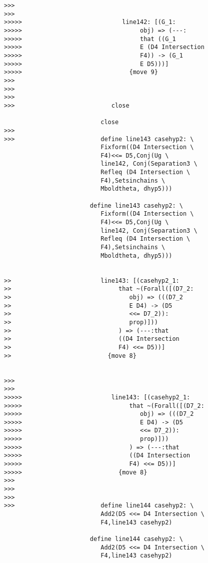 \documentclass[12pt]{article}
\begin{document}
\begin{verbatim}
>>>
>>>
>>>>>                            line142: [(G_1:
>>>>>                                 obj) => (---:
>>>>>                                 that ((G_1
>>>>>                                 E (D4 Intersection
>>>>>                                 F4)) -> (G_1
>>>>>                                 E D5)))]
>>>>>                              {move 9}
>>>
>>>
>>>
>>>                           close

                           close
>>>
>>>                        define line143 casehyp2: \
                           Fixform((D4 Intersection \
                           F4)<<= D5,Conj(Ug \
                           line142, Conj(Separation3 \
                           Refleq (D4 Intersection \
                           F4),Setsinchains \
                           Mboldtheta, dhyp5)))

                        define line143 casehyp2: \
                           Fixform((D4 Intersection \
                           F4)<<= D5,Conj(Ug \
                           line142, Conj(Separation3 \
                           Refleq (D4 Intersection \
                           F4),Setsinchains \
                           Mboldtheta, dhyp5)))


>>                         line143: [(casehyp2_1:
>>                              that ~(Forall([(D7_2:
>>                                 obj) => (((D7_2
>>                                 E D4) -> (D5
>>                                 <<= D7_2)):
>>                                 prop)]))
>>                              ) => (---:that
>>                              ((D4 Intersection
>>                              F4) <<= D5))]
>>                           {move 8}


>>>
>>>
>>>>>                         line143: [(casehyp2_1:
>>>>>                              that ~(Forall([(D7_2:
>>>>>                                 obj) => (((D7_2
>>>>>                                 E D4) -> (D5
>>>>>                                 <<= D7_2)):
>>>>>                                 prop)]))
>>>>>                              ) => (---:that
>>>>>                              ((D4 Intersection
>>>>>                              F4) <<= D5))]
>>>>>                           {move 8}
>>>
>>>
>>>
>>>                        define line144 casehyp2: \
                           Add2(D5 <<= D4 Intersection \
                           F4,line143 casehyp2)

                        define line144 casehyp2: \
                           Add2(D5 <<= D4 Intersection \
                           F4,line143 casehyp2)



\end{verbatim}
\end{document}
